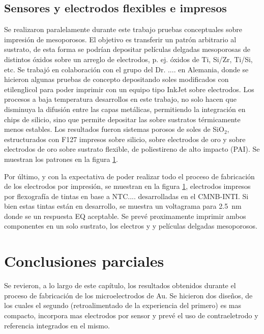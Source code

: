  	\subsection{Sensores y electrodos flexibles e impresos}

 	  Se realizaron paralelamente durante este trabajo pruebas conceptuales sobre impresión de mesoporosos. El objetivo es transferir un patrón arbitrario al sustrato, de esta forma se podrían depositar películas delgadas mesoporosas de distintos óxidos sobre un arreglo de electrodos, p. ej. óxidos de Ti, Si/Zr, Ti/Si, etc. Se trabajó en colaboración con el grupo del Dr. .... en Alemania, donde se hicieron algunas pruebas de concepto depositando soles modificados con etilenglicol para poder imprimir con un equipo tipo InkJet sobre electrodos. Los procesos a baja temperatura desarrollos en este trabajo, no solo hacen que disminuya la difusión entre las capas metálicas, permitiendo la integración en chips de silicio, sino que permite depositar las \pdm\space sobre sustratos térmicamente menos estables. Los resultados fueron sistemas porosos de soles de SiO$_2$, estructurados con F127 impresos sobre silicio, sobre electrodos de oro y sobre electrodos de oro sobre sustrato flexible, de poliestireno de alto impacto (PAI). Se muestran los patrones en la figura \ref{}.

 	  
 	  Por último, y con la expectativa de poder realizar todo el proceso de fabricación de los electrodos por impresión, se muestran en la figura \ref{}, electrodos impresos por flexografía de tintas en base a NTC.... desarrolladas en el CMNB-INTI. Si bien estas tintas están en desarrollo, se muestra un voltagrama para \fe\space \SI{2.5}{\nm} donde se un respuesta EQ aceptable. Se prevé proximamente imprimir ambos componentes en un solo sustrato, los electros y y películas delgadas mesoporosos.


 		

\section{Conclusiones parciales}

	Se revieron, a lo largo de este capítulo, los resultados obtenidos durante el proceso de fabricación de los microelectrodos de Au. Se hicieron dos diseños, de los cuales el segundo (retroalimentado de la experiencia del primero) es mas compacto, incorpora mas electrodos por sensor y prevé el uso de contraeletrodo y referencia integrados en el mismo.
	
